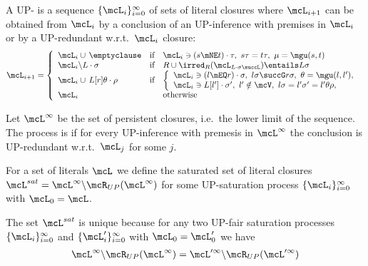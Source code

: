 \begin{definition}
    A UP- is
    a sequence \( \{ \mcL_i \}_{i=0}^\infty \)
    of sets of literal closures where
    \( \mcL_{i+1} \) can be obtained from
    \( \mcL_i \)
    by  a conclusion of an UP-inference with premises in \( \mcL_i \)
    or by  a UP-redundant w.r.t.~\(\mcL_i\) closure:
    \begin{gather*}
        \mcL_{i+1} = \left\{
            \begin{array}{lclc}
                \mcL_i \cup\,\emptyclause
                &\text{if}
                &
                    \mcL_i\ni(s\mNE t)\cdot\tau,\ {}
                    s\tau = t\tau,\ {}
                    \mu=\mgu(s,t)
                \\
                \mcL_i \backslash L\cdot\sigma
                &\text{if}
                &R \cup \irred_R(\mcL_{L\cdot\sigma\succL}) \entails L\sigma
                \\
                \mcL_i \cup\, L[r]\theta\cdot\rho
                &\text{if}
                &\left\{\begin{array}{l}
                    \mcL_i\ni(l\mEQ r)\cdot\sigma,\ {}
                    l\sigma\succG r\sigma,\ {}
                    \theta=\mgu(l,l'),
                    \\
                    \mcL_i\ni L[l']\cdot\sigma',\ {}
                    l'\notin\mcV,\ {}
                    l\sigma = l'\sigma' = l'\theta\rho,
                \end{array}\right.
                \\
                \mcL_i
                &&\text{otherwise}
            \end{array}
        \right.
    \end{gather*}

    Let \( \mcL^\infty \) be the set of persistent closures,
    i.e.~the lower limit of the sequence.
    The process is  if for every UP-inference
    with premesis in \( \mcL^\infty \) the conclusion is UP-redundant
    w.r.t.~\(\mcL_j\) for some \(j\).

    For a set of literals \( \mcL \) we define
    the saturated set of literal closures
    \( \mcL^{sat} = \mcL^\infty\backslash\mcR_{UP}(\mcL^\infty) \)
    for some UP-saturation process
    \( \{ \mcL_i\}_{i=0}^\infty \)
    with \( \mcL_0 = \mcL \).
\end{definition}

\begin{lemma}
    The set \( \mcL^{sat} \) is unique because
    for any two UP-fair saturation processes
    \(\{ \mcL_i
        \}_{i=0}^\infty\) and
        \(\{ \mcL'_i
        \}_{i=0}^\infty\)
        with \( \mcL_0 = \mcL'_0 \) we have
        \begin{gather*}
            \mcL^\infty \backslash \mcR_{UP}(\mcL^\infty)
            =
            \mcL'^\infty \backslash \mcR_{UP}(\mcL'^\infty)
        \end{gather*}
\end{lemma}

